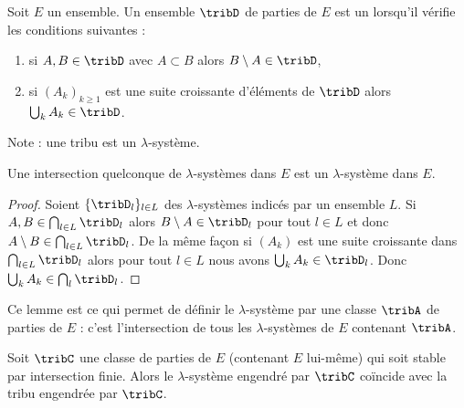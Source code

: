 \begin{definition}
    Soit \( E\) un ensemble. Un ensemble \( \tribD\) de parties de \( E\) est un  lorsqu'il vérifie les conditions suivantes :
    \begin{enumerate}
        \item
            si \( A,B\in\tribD\) avec \( A\subset B\) alors \( B\setminus A\in \tribD\),
        \item
            si \( (A_k)_{k\geq 1}\) est une suite croissante d'éléments de \( \tribD\) alors \( \bigcup_kA_k\in\tribD\).
    \end{enumerate}
\end{definition}
Note : une tribu est un \( \lambda\)-système.

\begin{lemma}
    Une intersection quelconque de \( \lambda\)-systèmes dans \( E\) est un \( \lambda\)-système dans \( E\).
\end{lemma}

\begin{proof}
    Soient \( \{ \tribD_l \}_{l\in L}\) des \( \lambda\)-systèmes indicés par un ensemble \( L\). Si \( A,B\in\bigcap_{l\in L}\tribD_l\) alors \( B\setminus A\in\tribD_l\) pour tout \( l\in L\) et donc \( A\setminus B\in\bigcap_{l\in L}\tribD_l\). De la même façon si \( (A_k)\) est une suite croissante dans \( \bigcap_{l\in L}\tribD_l\) alors pour tout \( l\in L\) nous avons \( \bigcup_kA_k\in\tribD_l\). Donc \( \bigcup_kA_k\in\bigcap_l\tribD_l\).
\end{proof}
Ce lemme est ce qui permet de définir le \( \lambda\)-système  par une classe \( \tribA\) de parties de \( E\) : c'est l'intersection de tous les \( \lambda\)-systèmes de \( E\) contenant \( \tribA\).

\begin{lemma}   \label{LemLUmopaZ}
    Soit \( \tribC\) une classe de parties de \( E\) (contenant \( E\) lui-même) qui soit stable par intersection finie. Alors le \( \lambda\)-système engendré par \( \tribC\) coïncide avec la tribu engendrée par \( \tribC\).
\end{lemma}

